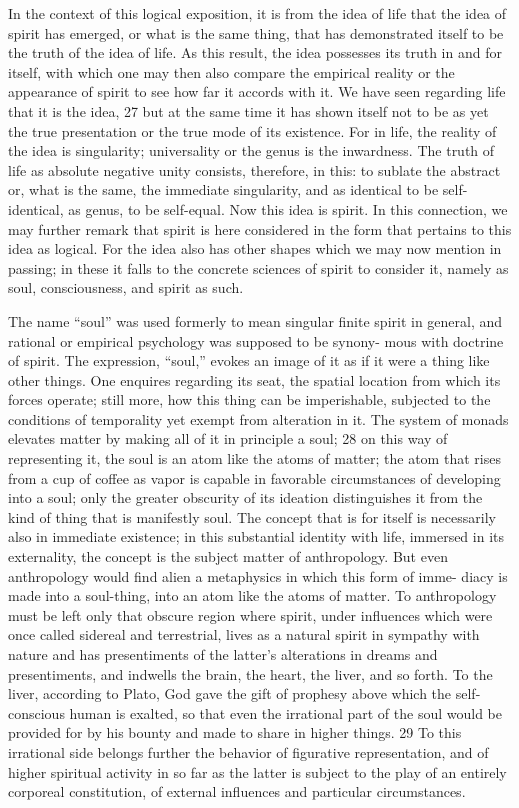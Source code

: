 In the context of this logical exposition, it is from the idea of life that the
idea of spirit has emerged, or what is the same thing, that has demonstrated
itself to be the truth of the idea of life. As this result, the idea possesses
its truth in and for itself, with which one may then also compare the
empirical reality or the appearance of spirit to see how far it accords with
it. We have seen regarding life that it is the idea, 27 but at the same time
it has shown itself not to be as yet the true presentation or the true mode
of its existence. For in life, the reality of the idea is singularity; universality
or the genus is the inwardness. The truth of life as absolute negative unity
consists, therefore, in this: to sublate the abstract or, what is the same, the
immediate singularity, and as identical to be self-identical, as genus, to be
self-equal. Now this idea is spirit.
 In this connection, we may further
remark that spirit is here considered in the form that pertains to this idea
as logical. For the idea also has other shapes which we may now mention
in passing; in these it falls to the concrete sciences of spirit to consider it,
namely as soul, consciousness, and spirit as such.

The name “soul” was used formerly to mean singular finite spirit in
general, and rational or empirical psychology was supposed to be synony-
mous with doctrine of spirit. The expression, “soul,” evokes an image of it
as if it were a thing like other things. One enquires regarding its seat, the
spatial location from which its forces operate; still more, how this thing
can be imperishable, subjected to the conditions of temporality yet exempt
from alteration in it. The system of monads elevates matter by making all
of it in principle a soul; 28 on this way of representing it, the soul is an
atom like the atoms of matter; the atom that rises from a cup of coffee as
vapor is capable in favorable circumstances of developing into a soul; only
the greater obscurity of its ideation distinguishes it from the kind of thing
that is manifestly soul.
 The concept that is for itself is necessarily also
in immediate existence; in this substantial identity with life, immersed in
its externality, the concept is the subject matter of anthropology. But even
anthropology would find alien a metaphysics in which this form of imme-
diacy is made into a soul-thing, into an atom like the atoms of matter.
To anthropology must be left only that obscure region where spirit,
under influences which were once called sidereal and terrestrial, lives as a
natural spirit in sympathy with nature and has presentiments of the latter's
alterations in dreams and presentiments, and indwells the brain, the heart,
the liver, and so forth. To the liver, according to Plato, God gave the gift
of prophesy above which the self-conscious human is exalted, so that even
the irrational part of the soul would be provided for by his bounty and
made to share in higher things. 29 To this irrational side belongs further the
behavior of figurative representation, and of higher spiritual activity in so
far as the latter is subject to the play of an entirely corporeal constitution,
of external influences and particular circumstances.

